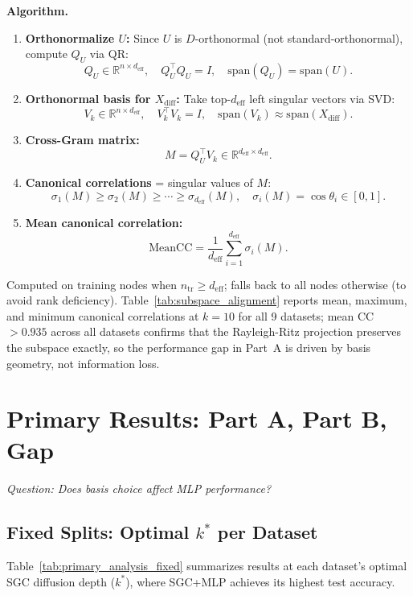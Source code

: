 \documentclass[11pt]{article}
\begin{document}
\textbf{Algorithm.}
\begin{enumerate}
  \item \textbf{Orthonormalize $U$:} Since $U$ is $D$-orthonormal (not standard-orthonormal),
    compute $Q_U$ via QR:
    \[Q_U \in \mathbb{R}^{n \times d_{\mathrm{eff}}}, \quad Q_U^\top Q_U = I,
      \quad \mathrm{span}(Q_U) = \mathrm{span}(U).\]
  \item \textbf{Orthonormal basis for $X_{\mathrm{diff}}$:} Take top-$d_{\mathrm{eff}}$
    left singular vectors via SVD:
    \[V_k \in \mathbb{R}^{n \times d_{\mathrm{eff}}}, \quad V_k^\top V_k = I,
      \quad \mathrm{span}(V_k) \approx \mathrm{span}(X_{\mathrm{diff}}).\]
  \item \textbf{Cross-Gram matrix:}
    \[M = Q_U^\top V_k \in \mathbb{R}^{d_{\mathrm{eff}} \times d_{\mathrm{eff}}}.\]
  \item \textbf{Canonical correlations} = singular values of $M$:
    \[\sigma_1(M) \geq \sigma_2(M) \geq \cdots \geq \sigma_{d_{\mathrm{eff}}}(M),
      \quad \sigma_i(M) = \cos\theta_i \in [0,1].\]
  \item \textbf{Mean canonical correlation:}
    \[\mathrm{MeanCC} = \frac{1}{d_{\mathrm{eff}}}\sum_{i=1}^{d_{\mathrm{eff}}} \sigma_i(M).\]
\end{enumerate}
Computed on training nodes when $n_{\mathrm{tr}} \geq d_{\mathrm{eff}}$;
falls back to all nodes otherwise (to avoid rank deficiency).
Table~\ref{tab:subspace_alignment} reports mean, maximum, and minimum canonical
correlations at $k{=}10$ for all 9 datasets; mean CC $> 0.935$ across all datasets
confirms that the Rayleigh-Ritz projection preserves the subspace exactly, so
the performance gap in Part~A is driven by basis geometry, not information loss.

\section{Primary Results: Part A, Part B, Gap}
\textit{Question: Does basis choice affect MLP performance?}
\label{sec:primary}

\subsection{Fixed Splits: Optimal $k^*$ per Dataset}

Table~\ref{tab:primary_analysis_fixed} summarizes results at each dataset's optimal SGC
diffusion depth ($k^*$), where SGC+MLP achieves its highest test accuracy.
\end{document}
